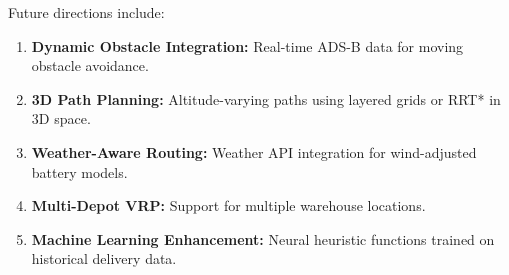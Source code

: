 \documentclass[11pt,a4paper,twocolumn]{article}
\begin{document}
Future directions include:

\begin{enumerate}[leftmargin=*]
    \item \textbf{Dynamic Obstacle Integration:} Real-time ADS-B data for moving obstacle avoidance.
    \item \textbf{3D Path Planning:} Altitude-varying paths using layered grids or RRT* in 3D space.
    \item \textbf{Weather-Aware Routing:} Weather API integration for wind-adjusted battery models.
    \item \textbf{Multi-Depot VRP:} Support for multiple warehouse locations.
    \item \textbf{Machine Learning Enhancement:} Neural heuristic functions trained on historical delivery data.
\end{enumerate}


\end{document}
